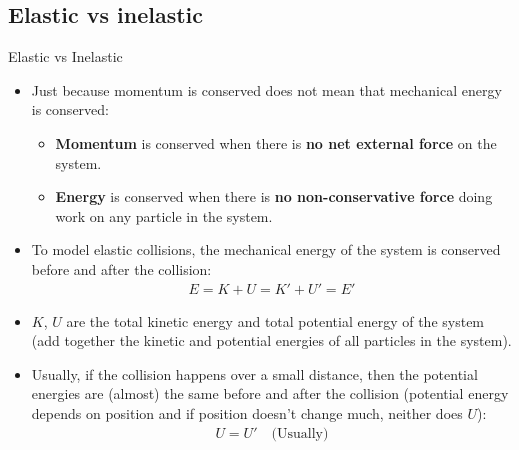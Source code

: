 \documentclass[aspectratio=169,
hyperref={colorlinks,urlcolor=blue}
]{beamer}
\begin{document}
{\begin{center}
\end{center}
}



\subsection{Elastic vs inelastic}
\label{subsec:elasticvinelastic}
\begin{frame}{Elastic vs Inelastic}
\begin{itemize}
\item Just because momentum is conserved does not mean that mechanical energy is conserved:
\begin{itemize}
\item \textbf{Momentum }is conserved when there is \textbf{no net external force} on the system.
\item \textbf{Energy} is conserved when there is \textbf{no non-conservative force} doing work on any particle in the system.
\end{itemize}
\item To model elastic collisions, the mechanical energy of the system is conserved before and after the collision:
\begin{align*}
E=K+U=K'+U'=E'
\end{align*}
\item $K$, $U$ are the total kinetic energy and total potential energy of the system (add together the kinetic and potential energies of all particles in the system).
\item Usually, if the collision happens over a small distance, then the potential energies are (almost) the same before and after the collision (potential energy depends on position and if position doesn’t change much, neither does $U$):
\begin{align*}
U=U'\quad \text{(Usually)}
\end{align*}
\end{itemize}
\end{frame}
\end{document}
